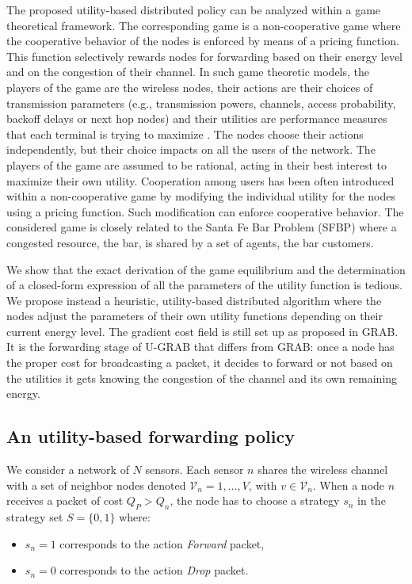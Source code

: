 \documentclass[journal, peerreview, onecolumn, draftcls]{IEEEtran}
\begin{document}
The proposed utility-based distributed policy can be analyzed within a game theoretical framework. The corresponding game is a non-cooperative game where the cooperative behavior of the nodes is enforced by means of a pricing function. This function selectively rewards nodes for forwarding based on their energy level and on the congestion of their channel. In such game theoretic models, the players of the game are the wireless nodes, their actions are their choices of transmission parameters (e.g., transmission powers, channels, access probability, backoff delays or next hop nodes) and their utilities are performance measures that each terminal is trying to maximize \cite{comaniciu07}. The nodes choose their actions independently, but their choice impacts on all the users of the network. The players of the game are assumed to be rational, acting in their best interest to maximize their own utility.
Cooperation among users has been often introduced within a non-cooperative game by modifying the individual utility for the nodes using a pricing function. Such modification can enforce cooperative behavior.
The considered game is closely related to the Santa Fe Bar Problem (SFBP)\cite{mishra} where a congested resource, the bar, is shared by a set of agents, the bar customers.

We show that the exact derivation of the game equilibrium and the determination of a closed-form expression of all the parameters of the utility function is tedious. We propose instead a heuristic, utility-based distributed algorithm where the nodes adjust the parameters of their own utility functions depending on their current energy level. The gradient cost field is still set up as proposed in GRAB. It is the forwarding stage of U-GRAB that differs from GRAB: once a node has the proper cost for broadcasting a packet, it decides to forward or not based on the utilities it gets knowing the congestion of the channel and its own remaining energy.

\subsection{An utility-based forwarding policy}

We consider a network of $N$ sensors. Each sensor $n$ shares the wireless channel with a set of neighbor nodes denoted $\mathcal{V}_n = {1,\dots, V}$, with $v \in \mathcal{V}_n$. When a node $n$ receives a packet of cost $Q_P>Q_n$, the node has to choose a strategy $s_n$ in the strategy set $S =\{0, 1\}$ where:
\begin{itemize}
\item $s_n=1$ corresponds to the action {\it Forward} packet,
\item $s_n=0$ corresponds to the action {\it Drop} packet.
\end{itemize}
\end{document}

